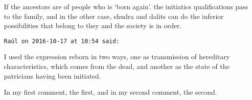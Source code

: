 \begin{footnotesize}
\begin{sffamily}
If the ancestors are of people who is `born again'. the initiatics qualifications pass to the family, and in the other case, shudra and dalits can do the inferior possibilities that belong to they and the society is in order.


\hfill

\texttt{Raúl on 2016-10-17 at 10:54 said: }

I used the expression reborn in two ways, one as transmission of hereditary characteristics, which comes from the dead, and another as the state of the patricians having been initiated.

In my first comment, the first, and in my second comment, the second.


\hfill


\end{sffamily}\end{footnotesize}
